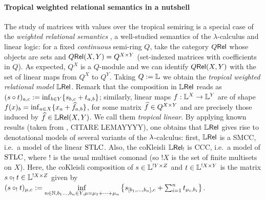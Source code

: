 \documentclass[submission,%
]{eptcs}
\begin{document}
\paragraph{Tropical weighted relational semantics in a nutshell}

The study of matrices with values over the tropical semiring is a special case of the
\emph{weighted relational semantics} \cite{Manzo2013}, a well-studied semantics of the $\lambda$-calculus and linear logic:
for a fixed \emph{continuous} semi-ring $Q$, take the category $Q \mathsf{Rel}$ whose objects are sets and ${Q \mathsf{Rel}}(X,Y)=Q^{X\times Y}$ (set-indexed matrices with coefficients in $Q$). %
As expected, $Q^X$ is a $Q$-module and we can identify ${Q \mathsf{Rel}}(X,Y)$ with the set of linear maps from $Q^X$ to $Q^Y$.
Taking $Q:=\mathbb{L}$ we obtain the \emph{tropical weighted relational model} $\mathbb{L} \mathsf{Rel}$.
Remark that the composition in $\mathbb{L} \mathsf{Rel}$ %
reads as \ $(s\circ t)_{a,c}:=\inf_{b\in Y}\{s_{b,c}+t_{a,b}\}$;
similarly, linear maps $f:\mathbb{L}^X\to \mathbb{L}^Y$ are of shape $f(x)_b=\inf_{a\in X} \{x_a+\widehat{f}_{a,b}\}$, for some matrix $\widehat{f}\in Q^{X\times Y}$ and are precisely those induced by $\widehat{f}\in{\mathbb{L}\mathsf{Rel}}(X,Y)$. We call them \emph{tropical linear}.
By applying known results (taken from \cite{Manzo2013},  {\color{red}CITARE LEMAYYYY}), one obtains that $\mathbb{L} \mathsf{Rel}$ gives rise to denotational models of several variants of the $\lambda$-calculus:
first, $\mathbb{L} \mathsf{Rel}$ is a SMCC, i.e.\ a model of the linear $\mathrm{STLC}$.
Also, the coKleisli $\mathbb{L} \mathsf{Rel}_!$ is CCC, i.e.\ a model of $\mathrm{STLC}$, where $!$ is the usual multiset comonad (so $!X$ is the set of finite multisets on $X$).
Here, the coKleisli composition of $s\in\mathbb{L}^{!Y\times Z}$ and $t\in\mathbb{L}^{!X\times Y}$ is the matrix $s\circ_! t\in\mathbb{L}^{!X\times Z}$ given by
$(s\circ_! t)_{\mu,c}:=
 \inf\limits_{n\in\mathbb{N}, b_1\dots,b_n\in Y, \mu = \mu_1+\cdots +\mu_n}
 \left\{s_{[b_1,\dots,b_n],c} + \sum_{i=1}^n t_{\mu_i,b_i}\right\}$.
\end{document}
